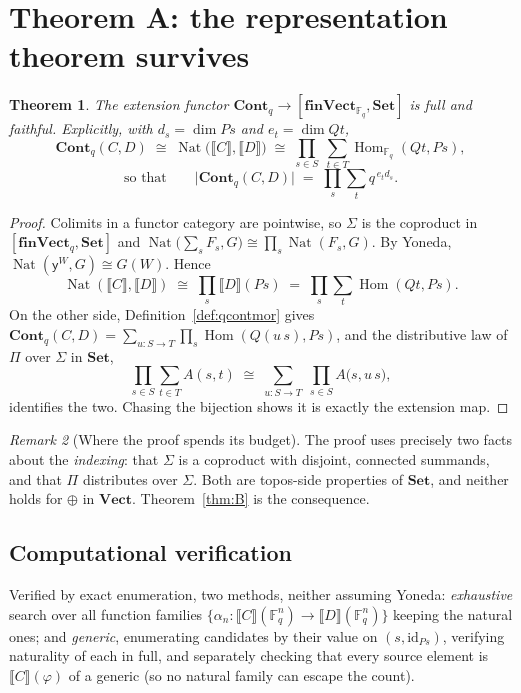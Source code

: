 \documentclass[11pt,a4paper]{article}
\newtheorem{theorem}{Theorem}[section]
\theoremstyle{definition}
\theoremstyle{remark}
\newtheorem{remark}[theorem]{Remark}
\newcommand{\FF}{\mathbb{F}}
\newcommand{\cat}[1]{\mathbf{#1}}
\newcommand{\Set}{\cat{Set}}
\newcommand{\Vect}{\cat{Vect}}
\newcommand{\finVect}{\cat{finVect}}
\newcommand{\Cont}{\cat{Cont}}
\newcommand{\ext}[1]{\llbracket #1 \rrbracket}
\DeclareMathOperator{\Hom}{Hom}
\DeclareMathOperator{\Nat}{Nat}
\newcommand{\yon}{\mathsf{y}}
\begin{document}
\section{Theorem A: the representation theorem survives}

\begin{theorem}\label{thm:A}
The extension functor $\Cont_q \to [\finVect_{\FF_q}, \Set]$ is full and
faithful. Explicitly, with $d_s = \dim P s$ and $e_t = \dim Q t$,
\[
  \Cont_q(C,D) \;\cong\; \Nat\bigl(\ext{C},\ext{D}\bigr)
  \;\cong\; \prod_{s \in S} \; \sum_{t \in T} \Hom_{\FF_q}(Q t, P s),
\]
\[
  \text{so that}\qquad
  \bigl\lvert \Cont_q(C,D) \bigr\rvert \;=\; \prod_{s} \sum_{t} q^{\,e_t d_s}.
\]
\end{theorem}

\begin{proof}
Colimits in a functor category are pointwise, so $\Sigma$ is the coproduct in
$[\finVect_q, \Set]$ and
$\Nat\bigl(\sum_s F_s, G\bigr) \cong \prod_s \Nat(F_s, G)$. By Yoneda,
$\Nat(\yon^{W}, G) \cong G(W)$. Hence
\[
  \Nat(\ext{C},\ext{D})
  \;\cong\; \prod_{s} \ext{D}(P s)
  \;=\; \prod_{s} \sum_{t} \Hom(Q t, P s).
\]
On the other side, Definition~\ref{def:qcontmor} gives
$\Cont_q(C,D) = \sum_{u : S \to T} \prod_{s} \Hom(Q(u\,s), P s)$, and the
distributive law of $\Pi$ over $\Sigma$ in $\Set$,
\[
  \prod_{s \in S} \sum_{t \in T} A(s,t)
  \;\cong\; \sum_{u : S \to T} \; \prod_{s \in S} A\bigl(s, u\,s\bigr),
\]
identifies the two. Chasing the bijection shows it is exactly the extension map.
\end{proof}

\begin{remark}[Where the proof spends its budget]\label{rem:budget}
The proof uses precisely two facts about the \emph{indexing}: that $\Sigma$ is a
coproduct with disjoint, connected summands, and that $\Pi$ distributes over
$\Sigma$. Both are topos-side properties of $\Set$, and neither holds for $\oplus$
in $\Vect$. Theorem~\ref{thm:B} is the consequence.
\end{remark}

\subsection{Computational verification}

Verified by exact enumeration, two methods, neither assuming Yoneda:
\emph{exhaustive} search over all function families
$\{\alpha_n : \ext{C}(\FF_q^n) \to \ext{D}(\FF_q^n)\}$ keeping the natural ones;
and \emph{generic}, enumerating candidates by their value on
$(s, \mathrm{id}_{P s})$, verifying naturality of each in full, and separately
checking that every source element is $\ext{C}(\varphi)$ of a generic (so no
natural family can escape the count).
\end{document}
